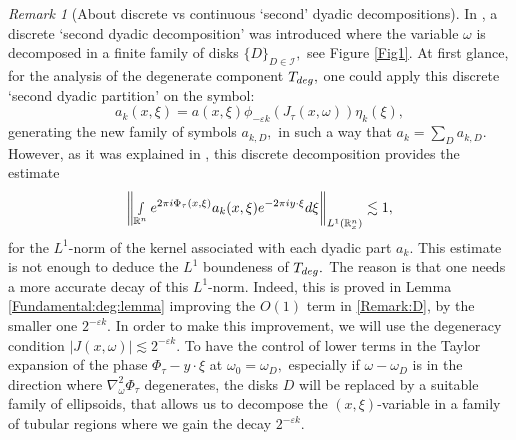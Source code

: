 \documentclass[12pt, reqno]{amsart}
\theoremstyle{definition}
\theoremstyle{remark}
\newtheorem{remark}[theorem]{Remark}
\numberwithin{equation}{section}
\begin{document}
\begin{remark}[About discrete vs continuous `second' dyadic decompositions]
In \cite{SSS}, a discrete `second dyadic decomposition' was introduced where the variable $\omega$ is decomposed in a finite family of disks $\{D\}_{D\in \mathcal{I}},$ see Figure \ref{Fig1}. At first glance,  for the analysis of the degenerate component  $T_{\textnormal{deg}},$ one could apply this discrete `second dyadic partition' on the symbol:
$$  a_{k}(x,\xi)= a(x,\xi)\phi_{-\varepsilon k}(J_{\tau}(x,\omega))\eta_{k}(\xi),$$ generating the new family of symbols $a_{k,D},$ in such a way that $a_k=\sum_{D}a_{k,D}.$ However, as it was explained in \cite{Tao}, this discrete decomposition provides the estimate
\begin{equation}\label{Remark:D}
    \left\Vert \smallint\limits_{\mathbb{R}^n}e^{2\pi i\Phi_\tau(x,\xi)}a_k(x,\xi)e^{-2\pi i y\cdot \xi}   d\xi \right\Vert_{L^1(\mathbb{R}^n_x)}\lesssim 1,
\end{equation} for the  $L^1$-norm of the kernel associated with each dyadic part $a_k.$ This estimate is not enough to deduce the $L^1$ boundeness of $T_{\textnormal{deg}}.$ The reason is that one needs a more accurate decay of this $L^1$-norm. Indeed, this is proved in Lemma \ref{Fundamental:deg:lemma} improving the $O(1)$ term in  \eqref{Remark:D}, by the smaller one $2^{-\varepsilon k}.$ In order to make this improvement, we will use the degeneracy condition $|J(x,\omega)|\lesssim 2^{-\varepsilon k}.$ To have the control of lower terms in the Taylor expansion of the phase $\Phi_\tau-y\cdot \xi$ at $\omega_0=\omega_D,$ especially if $\omega-\omega_D$ is in the direction where $\nabla_\omega^2\Phi_\tau$ degenerates, the disks $D$ will be replaced by a suitable family of ellipsoids, that allows us to decompose the $(x,\xi)$-variable in a family of tubular regions where we gain the decay $2^{-\varepsilon k}.$ 


\end{remark}
\end{document}
